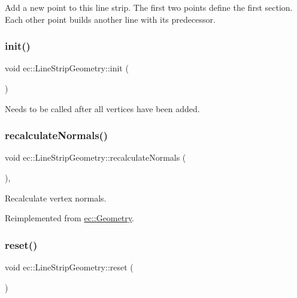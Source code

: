 Add a new point to this line strip. The first two points define the first section. Each other point builds another line with its predecessor. \mbox{\label{classec_1_1_line_strip_geometry_a8dac12c33ec187961ba4ac1573d718a5}} 
\subsubsection{\texorpdfstring{init()}{init()}}
{\footnotesize\ttfamily void ec\+::\+Line\+Strip\+Geometry\+::init (\begin{DoxyParamCaption}{ }\end{DoxyParamCaption})}

Needs to be called after all vertices have been added. \mbox{\label{classec_1_1_line_strip_geometry_a8b78bf56551a9536f5a2dace78ce4fcd}} 
\subsubsection{\texorpdfstring{recalculate\+Normals()}{recalculateNormals()}}
{\footnotesize\ttfamily void ec\+::\+Line\+Strip\+Geometry\+::recalculate\+Normals (\begin{DoxyParamCaption}{ }\end{DoxyParamCaption})\hspace{0.3cm}{\ttfamily [override]}, {\ttfamily [virtual]}}



Recalculate vertex normals. 



Reimplemented from \mbox{\hyperlink{classec_1_1_geometry_a228d4a0fa01a17379f24aee2c769b501}{ec\+::\+Geometry}}.

\mbox{\label{classec_1_1_line_strip_geometry_abaf125f40af2b979e4b3af3939bb0a0e}} 
\subsubsection{\texorpdfstring{reset()}{reset()}}
{\footnotesize\ttfamily void ec\+::\+Line\+Strip\+Geometry\+::reset (\begin{DoxyParamCaption}{ }\end{DoxyParamCaption})}

